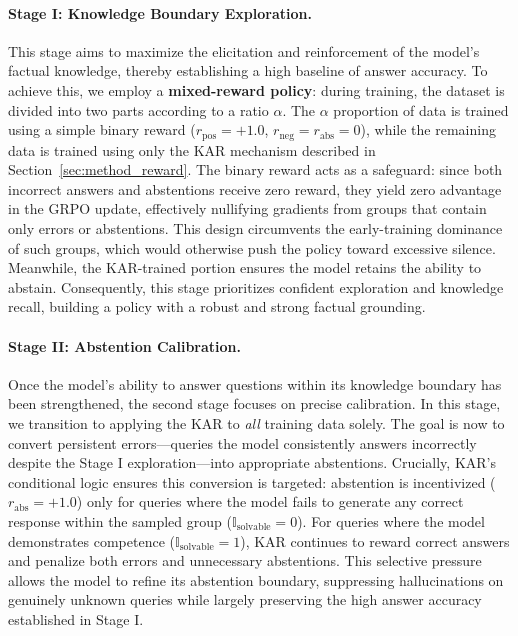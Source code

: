 \documentclass{article} %
\newcommand{\rewardname}{\textsc{KAR}}
\begin{document}
\paragraph{Stage I: Knowledge Boundary Exploration.} 
This stage aims to maximize the elicitation and reinforcement of the model's factual knowledge, thereby establishing a high baseline of answer accuracy. 
To achieve this, we employ a \textbf{mixed-reward policy}: during training, the dataset is divided into two parts according to a ratio $\alpha$. The $\alpha$ proportion of data is trained using a simple binary reward ($r_{\text{pos}}=+1.0$, $r_{\text{neg}}=r_{\text{abs}}=0$), while the remaining data is trained using only the \rewardname{} mechanism described in Section~\ref{sec:method_reward}.
The binary reward acts as a safeguard: since both incorrect answers and abstentions receive zero reward, they yield zero advantage in the GRPO update, effectively nullifying gradients from groups that contain only errors or abstentions. 
This design circumvents the early-training dominance of such groups, which would otherwise push the policy toward excessive silence. Meanwhile, the \rewardname{}-trained portion ensures the model retains the ability to abstain. Consequently, this stage prioritizes confident exploration and knowledge recall, building a policy with a robust and strong factual grounding.


\paragraph{Stage II: Abstention Calibration.} 
Once the model's ability to answer questions within its knowledge boundary has been strengthened, the second stage focuses on precise calibration. 
In this stage, we transition to applying the \rewardname{} to \textit{all} training data solely. 
The goal is now to convert persistent errors---queries the model consistently answers incorrectly despite the Stage I exploration---into appropriate abstentions. Crucially, \rewardname{}'s conditional logic ensures this conversion is targeted: abstention is incentivized ($r_{\text{abs}}=+1.0$) only for queries where the model fails to generate any correct response within the sampled group ($\mathbb{I}_{\text{solvable}}=0$). 
For queries where the model demonstrates competence ($\mathbb{I}_{\text{solvable}}=1$), \rewardname{} continues to reward correct answers and penalize both errors and unnecessary abstentions. This selective pressure allows the model to refine its abstention boundary, suppressing hallucinations on genuinely unknown queries while largely preserving the high answer accuracy established in Stage I.
\end{document}
